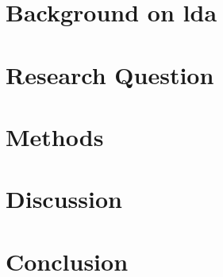 \documentclass[twocolumn]{article}
\numberwithin{equation}{section} %
\numberwithin{figure}{section} %
\numberwithin{table}{section} %
\begin{document}
\section{Background on \acf{lda}}





\section{Research Question}





\section{Methods}





\section{Discussion}





\section{Conclusion}





\clearpage


\end{document}
